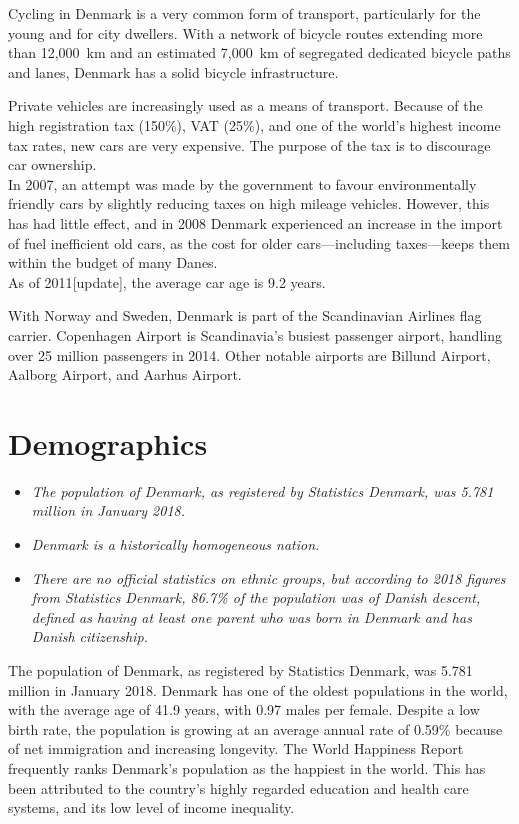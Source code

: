Cycling in Denmark is a very common form of transport, particularly for
the young and for city dwellers. With a network of bicycle routes
extending more than 12,000~km and an estimated 7,000~km of segregated
dedicated bicycle paths and lanes, Denmark has a solid bicycle
infrastructure.

Private vehicles are increasingly used as a means of transport. Because
of the high registration tax (150\%), VAT (25\%), and one of the world's
highest income tax rates, new cars are very expensive. The purpose of
the tax is to discourage car ownership.\\
In 2007, an attempt was made by the government to favour environmentally
friendly cars by slightly reducing taxes on high mileage vehicles.
However, this has had little effect, and in 2008 Denmark experienced an
increase in the import of fuel inefficient old cars, as the cost for
older cars---including taxes---keeps them within the budget of many
Danes.\\
As of 2011{[}update{]}, the average car age is 9.2 years.

With Norway and Sweden, Denmark is part of the Scandinavian Airlines
flag carrier. Copenhagen Airport is Scandinavia's busiest passenger
airport, handling over 25 million passengers in 2014. Other notable
airports are Billund Airport, Aalborg Airport, and Aarhus Airport.

\section{Demographics}\label{demographics}

\begin{itemize}
\item
  \emph{The population of Denmark, as registered by Statistics Denmark,
  was 5.781 million in January 2018.}
\item
  \emph{Denmark is a historically homogeneous nation.}
\item
  \emph{There are no official statistics on ethnic groups, but according
  to 2018 figures from Statistics Denmark, 86.7\% of the population was
  of Danish descent, defined as having at least one parent who was born
  in Denmark and has Danish citizenship.}
\end{itemize}

The population of Denmark, as registered by Statistics Denmark, was
5.781 million in January 2018. Denmark has one of the oldest populations
in the world, with the average age of 41.9 years, with 0.97 males per
female. Despite a low birth rate, the population is growing at an
average annual rate of 0.59\% because of net immigration and increasing
longevity. The World Happiness Report frequently ranks Denmark's
population as the happiest in the world. This has been attributed to the
country's highly regarded education and health care systems, and its low
level of income inequality.

